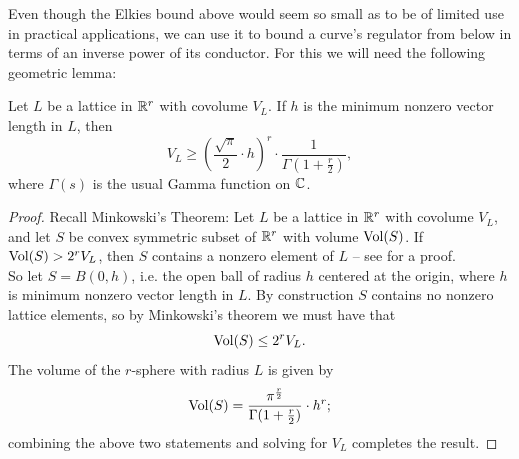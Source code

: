 Even though the Elkies bound above would seem so small as to be  of limited use in practical applications, we can use it to bound a curve's regulator from below in terms of an inverse power of its conductor. For this we will need the following geometric lemma:


\begin{lemma}\label{lem:covolume_lower_bound}
Let $L$ be a lattice in $\mathbb{R}^r$ with covolume $V_L$. If $h$ is the minimum nonzero vector length in $L$, then
\begin{equation}
V _L \ge \left(\frac{\sqrt{\pi}}{2}\cdot h\right)^{r} \cdot \frac{1}{\Gamma(1+\frac{r}{2})},
\end{equation}
where $\Gamma(s)$ is the usual Gamma function on $\mathbb{C}$.
\end{lemma}
\begin{proof}
Recall Minkowski's Theorem: Let $L$ be a lattice in $\mathbb{R}^r$ with covolume $V_L$, and let $S$ be convex symmetric subset of $\mathbb{R}^r$ with volume $\operatorname{Vol}(S)$. If $\operatorname{Vol}(S)>2^r V_L$, then $S$ contains a nonzero element of $L$ -- see \cite[p. 80]{st-2012} for a proof. \\

So let $S = B(0,h)$, i.e. the open ball of radius $h$ centered at the origin, where $h$ is minimum nonzero vector length in $L$. By construction $S$ contains no nonzero lattice elements, so by Minkowski's theorem we must have that
\begin{equation}
\operatorname{Vol}(S) \le 2^r V_L.
\end{equation}
The volume of the $r$-sphere with radius $L$ is given by
\begin{equation}
\operatorname{Vol}(S) = \frac{\pi^{\frac{r}{2}}}{\Gamma(1+\frac{r}{2})} \cdot h^r;
\end{equation}
combining the above two statements and solving for $V_L$ completes the result.
\end{proof}

